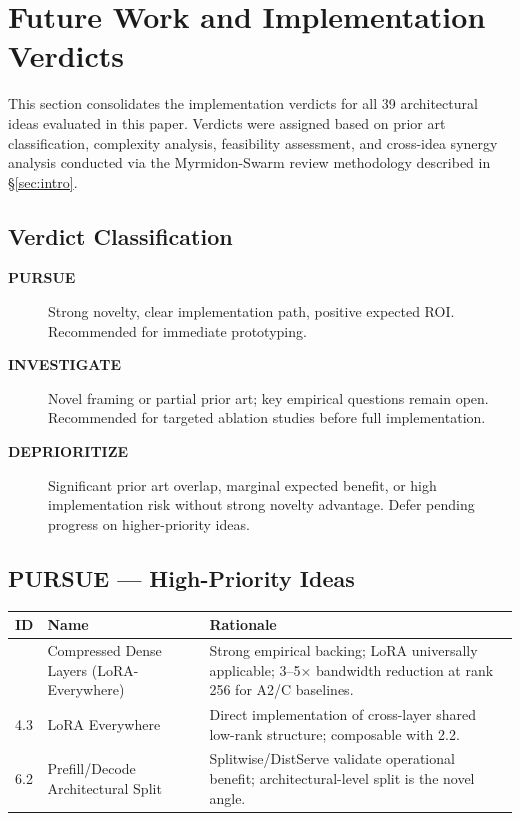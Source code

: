 \documentclass[11pt]{article}
\begin{document}
\section{Future Work and Implementation Verdicts}
\label{sec:futurework}

This section consolidates the implementation verdicts for all 39 architectural ideas evaluated in this paper. Verdicts were assigned based on prior art classification, complexity analysis, feasibility assessment, and cross-idea synergy analysis conducted via the Myrmidon-Swarm review methodology described in \S\ref{sec:intro}.

\subsection{Verdict Classification}

\begin{description}
  \item[\textbf{PURSUE}] Strong novelty, clear implementation path, positive expected ROI. Recommended for immediate prototyping.
  \item[\textbf{INVESTIGATE}] Novel framing or partial prior art; key empirical questions remain open. Recommended for targeted ablation studies before full implementation.
  \item[\textbf{DEPRIORITIZE}] Significant prior art overlap, marginal expected benefit, or high implementation risk without strong novelty advantage. Defer pending progress on higher-priority ideas.
\end{description}

\subsection{PURSUE --- High-Priority Ideas}

\begin{longtable}{lp{5cm}p{7cm}}
\toprule
\textbf{ID} & \textbf{Name} & \textbf{Rationale} \\
\midrule
\endhead
\bottomrule
\endfoot
2.2 & Compressed Dense Layers (LoRA-Everywhere) & Strong empirical backing; LoRA universally applicable; 3--5$\times$ bandwidth reduction at rank 256 for A2/C baselines. \\
4.3 & LoRA Everywhere & Direct implementation of cross-layer shared low-rank structure; composable with 2.2. \\
6.2 & Prefill/Decode Architectural Split & Splitwise/DistServe validate operational benefit; architectural-level split is the novel angle. \\
\end{longtable}
\end{document}
